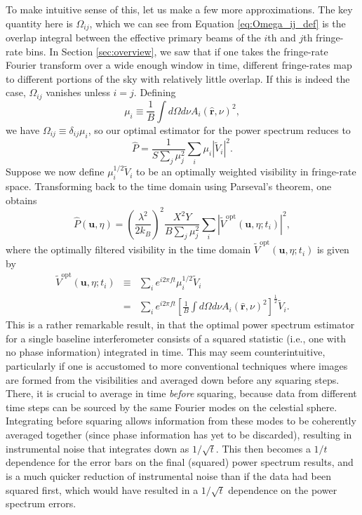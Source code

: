 \documentclass[twocolumn,apj,numberedappendix]{emulateapj}
\newcommand{\rhat}{\hat{\mathbf{r}}}
\begin{document}
To make intuitive sense of this, let us make a few more approximations. The key quantity here is $\Omega_{ij}$, which we can see from Equation \eqref{eq:Omega_ij_def} is the overlap integral between the effective primary beams of the $i$th and $j$th fringe-rate bins. In Section \ref{sec:overview}, we saw that if one takes the fringe-rate Fourier transform over a wide enough window in time, different fringe-rates map to different portions of the sky with relatively little overlap. If this is indeed the case, $\Omega_{ij}$ vanishes unless $i=j$. Defining
\begin{equation}
\mu_i  \equiv \frac{1}{B} \int d\Omega d\nu A_i(\rhat,\nu)^2,
\end{equation}
we have $\Omega_{ij} \equiv \delta_{ij} \mu_i$, so our optimal estimator for the power spectrum reduces to
\begin{equation}
\widehat{P} = \frac{1}{S \sum_j \mu_j^2}\sum_i \mu_i | \widetilde{V}_i |^2 .
\end{equation}
Suppose we now define $\mu_i^{1/2} \widetilde{V}_i$ to be an optimally weighted visibility in fringe-rate space. Transforming back to the time domain using Parseval's theorem, one obtains
\begin{equation}
\label{eq:finalEst}
\widehat{P}(\mathbf{u}, \eta) = \left( \frac{\lambda^2}{2 k_B} \right)^2 \frac{X^2 Y}{B\sum_j \mu_j^2} \sum_i |\widetilde{V}^\textrm{opt} (\mathbf{u}, \eta; t_i)|^2,
\end{equation}
where the optimally filtered visibility in the time domain $\widetilde{V}^\textrm{opt} (\mathbf{u}, \eta; t_i)$ is given by
\begin{eqnarray}
\widetilde{V}^\textrm{opt} (\mathbf{u}, \eta; t_i) &\equiv& \sum_i e^{i 2 \pi f t} \mu_i^{1/2} \widetilde{V}_i \nonumber \\
&=&  \sum_i e^{i 2 \pi f t} \left[\frac{1}{B} \int d\Omega d\nu A_i(\rhat,\nu)^2\right]^\frac{1}{2} \widetilde{V}_i. \qquad
\end{eqnarray}
This is a rather remarkable result, in that the optimal power spectrum estimator for a single baseline interferometer consists of a squared statistic (i.e., one with no phase information) integrated in time. This may seem counterintuitive, particularly if one is accustomed to more conventional techniques where images are formed from the visibilities and averaged down before any squaring steps. There, it is crucial to average in time \emph{before} squaring, because data from different time steps can be sourced by the same Fourier modes on the celestial sphere. Integrating before squaring allows information from these modes to be coherently averaged together (since phase information has yet to be discarded), resulting in instrumental noise that integrates down as $1/\sqrt{t}$. This then becomes a $1/t$ dependence for the error bars on the final (squared) power spectrum results, and is a much quicker reduction of instrumental noise than if the data had been squared first, which would have resulted in a $1/\sqrt{t}$ dependence on the power spectrum errors.
\end{document}
